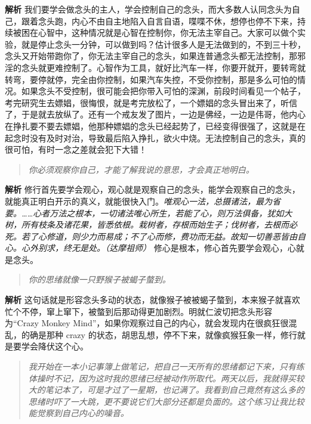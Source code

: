 \textbf{解析} 我们要学会做念头的主人，学会控制自己的念头，而大多数人认同念头为自己，跟着念头跑，内心不由自主地陷入自言自语，喋喋不休，想停也停不下来，持续被困在心智中，这种情况就是心智在控制你，你无法主宰自己。大家可以做个实验，就是停止念头一分钟，可以做到吗？估计很多人是无法做到的，不到三十秒，念头又开始带跑你了，你无法主宰自己的念头，如果连普通念头都无法控制，那邪淫的念头就更难控制了。心智作为工具，就好比汽车一样，你要开就开，要转弯就转弯，要停就停，完全由你控制，如果汽车失控，不受你控制，那是多么可怕的情况。如果念头不受控制，很可能会把你带入可怕的深渊，前段时间看见一个帖子，考完研究生去嫖娼，很悔恨，就是考完放松了，一个嫖娼的念头冒出来了，听信了，于是就去放纵了。还有一个戒友发了图片，一边是佛经，一边是伟哥，他内心在挣扎要不要去嫖娼，他那种嫖娼的念头已经起势了，已经变得很强了，这就是在起念时没有及时对治，导致最后陷入挣扎，欲火中烧。无法控制自己的念头，真的很可怕，有时一念之差就会犯下大错！

\begin{quote}\it
    你必须观察你自己，才能了解我说的意思，才会真正地明白。
\end{quote}

\textbf{解析} 修行首先要学会观心，观心就是观察自己的念头，能学会观察自己的念头，就能真正明白开示的真义，就能很快入门。\textit{唯观心一法，总摄诸法，最为省要。……心者万法之根本，一切诸法唯心所生，若能了心，则万法俱备，犹如大树，所有枝条及诸花果，皆悉依根。栽树者，存根而始生子；伐树者，去根而必死。若了心修道，则少力而易成；不了心而修，费功而无益。故知一切善恶皆由自心。心外别求，终无是处。（达摩祖师）} 修心是根本，修心首先要学会观心，心就是念头。

\begin{quote}\it
    你的思绪就像一只野猴子被蝎子螫到。
\end{quote}

\textbf{解析} 这句话就是形容念头多动的状态，就像猴子被被蝎子螫到，本来猴子就喜欢忙个不停，窜上窜下，被螫到后那动得更加剧烈。明就仁波切把念头形容为“Crazy Monkey Mind”，如果你观察过自己的内心，就会发现内在很疯狂很混乱，的确是那种 crazy 的状态，胡思乱想，停不下来，就像疯猴狂象一样，修行就是要学会降伏这个心。

\begin{quote}\it
    我开始在一本小记事簿上做笔记，把自己一天所有的思绪都记下来，只有练体操时不记，因为这时我的思绪已经被动作所取代。两天以后，我就得买较大的笔记本了，可是才过了一星期，也记满了。我看到自己竟然有这么多的思绪时吓了一大跳，更不要说它们大部分还都是负面的。这个练习让我比较能觉察到自己内心的噪音。
\end{quote}

